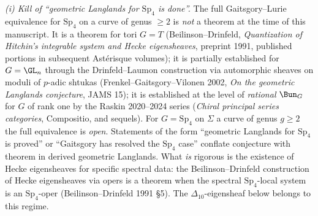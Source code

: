 \begin{proposition}
\emph{(i) Kill of ``geometric Langlands for $\mathrm{Sp}_4$ is done''.}
The full Gaitsgory--Lurie equivalence for $\mathrm{Sp}_4$ on a curve of
genus $\geq 2$ is \emph{not} a theorem at the time of this manuscript.
It is a theorem for tori $G=T$ (Beilinson--Drinfeld, \emph{Quantization
of Hitchin's integrable system and Hecke eigensheaves}, preprint 1991,
published portions in subsequent Astérisque volumes); it is partially
established for $G=\GL_n$ through the Drinfeld--Laumon construction
via automorphic sheaves on moduli of $p$-adic shtukas
(Frenkel--Gaitsgory--Vilonen 2002, \emph{On the geometric Langlands
conjecture}, JAMS 15); it is established at the level of
\emph{rational} $\Bun_G$ for $G$ of rank one by the Raskin 2020--2024
series (\emph{Chiral principal series categories}, Compositio, and
sequels). For $G=\mathrm{Sp}_4$ on $\Sigma$ a curve of genus
$g\geq 2$ the full equivalence is \emph{open}. Statements of the form
``geometric Langlands for $\mathrm{Sp}_4$ is proved'' or ``Gaitsgory
has resolved the $\mathrm{Sp}_4$ case'' conflate conjecture with
theorem in derived geometric Langlands. What \emph{is} rigorous is the
existence of Hecke eigensheaves for specific spectral data: the
Beilinson--Drinfeld construction of Hecke eigensheaves via opers is
a theorem when the spectral $\mathrm{Sp}_4$-local system is an
$\mathrm{Sp}_4$-oper (Beilinson--Drinfeld 1991 \S 5). The
$\Delta_{10}$-eigensheaf below belongs to this regime.


\end{proposition}
